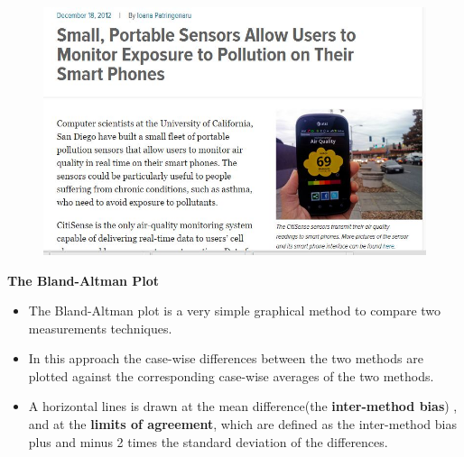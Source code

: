 \documentclass[compress]{beamer}        %
\makeatletter
\newcommand{\tcb}{\textcolor{beamer@blendedblue}}
\makeatother
\begin{document}
\begin{frame}
	\begin{figure}
\centering
\includegraphics[width=1.05\linewidth]{airqualitysensornewsarticle}

\end{figure}

\end{frame}

\begin{frame}{\bf \tcb{The Bland-Altman Plot}}
	\large
\begin{itemize}\itemsep0.7cm

\item The Bland-Altman plot \cite{BA86,BA99} is a very simple graphical method to compare two measurements techniques. \item In this approach the case-wise differences between the two methods are plotted against the corresponding case-wise averages of the two methods.

\item A horizontal lines is drawn at the mean difference(the\textbf{ inter-method bias}) , and at the \textbf{limits of agreement}, which are defined as the inter-method bias plus and minus 2 times the standard deviation of the differences.

\end{itemize}
\end{frame}
\end{document}
